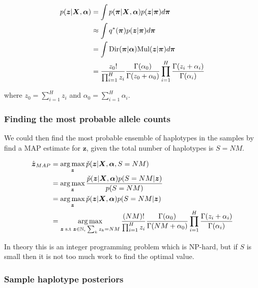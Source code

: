 \documentclass{article}
\DeclareMathOperator*{\argmax}{arg\,max}
\begin{document}
\begin{align}
\label{eq:z_pp}
    p(\boldsymbol{z} | \boldsymbol{X}, \boldsymbol{\alpha}) &= \int p(\boldsymbol{\pi} | \boldsymbol{X}, \boldsymbol{\alpha}) p(\boldsymbol{z} | \boldsymbol{\pi}) d\boldsymbol{\pi}\notag\\
    &\approx \int q^*(\boldsymbol{\pi}) p(\boldsymbol{z} | \boldsymbol{\pi}) d\boldsymbol{\pi}\notag\\
    &= \int \text{Dir}(\boldsymbol{\pi} | \boldsymbol{\alpha}) \text{Mul}(\boldsymbol{z} | \boldsymbol{\pi}) d\boldsymbol{\pi}\notag\\
    &= \frac{z_0!}{\prod_{i = 1}^{H} z_i} \frac{\Gamma(\alpha_0)}{\Gamma(z_0 + \alpha_0)} \prod_{i = 1}^H \frac{\Gamma(z_i + \alpha_i)}{\Gamma(\alpha_i)}
\end{align}

where $z_0 = \sum_{i = 1}^H z_i$ and $\alpha_0 = \sum_{i = 1}^H \alpha_i$.

\subsubsection{Finding the most probable allele counts}

We could then find the most probable ensemble of haplotypes in the samples by find a MAP estimate for $\boldsymbol{z}$, given the total number of haplotypes is $S = NM$.

\begin{align}
    \hat{\boldsymbol{z}}_{MAP} &= \argmax_{\boldsymbol{z}} \check{p}(\boldsymbol{z} | \boldsymbol{X}, \boldsymbol{\alpha}, S = NM)\notag\\
    &= \argmax_{\boldsymbol{z}} \frac{\check{p}(\boldsymbol{z} | \boldsymbol{X}, \boldsymbol{\alpha})p(S = NM | \boldsymbol{z})}{p(S = NM)}\notag\\
    &= \argmax_{\boldsymbol{z}} \check{p}(\boldsymbol{z} | \boldsymbol{X}, \boldsymbol{\alpha})p(S = NM | \boldsymbol{z})\notag\\
    &= \argmax_{\boldsymbol{z} \; \text{s.t} \; \boldsymbol{z} \in \mathbb{N},\; \sum_k z_k = NM} \frac{(NM)!}{\prod_{i = 1}^{H} z_i} \frac{\Gamma(\alpha_0)}{\Gamma(NM + \alpha_0)} \prod_{i = 1}^H \frac{\Gamma(z_i + \alpha_i)}{\Gamma(\alpha_i)}
\end{align}

In theory this is an integer programming problem which is NP-hard, but if $S$ is small then it is not too much work to find the optimal value.

\subsubsection{Sample haplotype posteriors}
\end{document}
